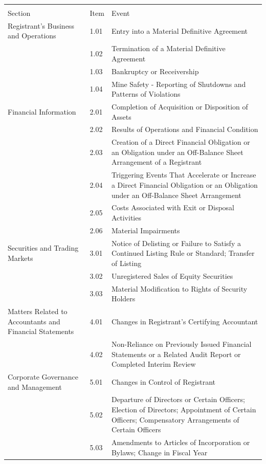 \documentclass{article}
\begin{document}
\begin{table}[h!]
	\begin{tabularx}{\textwidth}{|X|l|X|}
		\toprule
		&      &                                   \\
		Section & Item & Event \\
		\midrule
		Registrant's Business and Operations & 1.01 & Entry into a Material Definitive Agreement \\
		& 1.02 & Termination of a Material Definitive Agreement \\
		& 1.03 & Bankruptcy or Receivership \\
		& 1.04 & Mine Safety - Reporting of Shutdowns and Patterns of Violations \\
		Financial Information & 2.01 & Completion of Acquisition or Disposition of Assets \\
		& 2.02 & Results of Operations and Financial Condition \\
		& 2.03 & Creation of a Direct Financial Obligation or an Obligation under an Off-Balance Sheet Arrangement of a Registrant \\
		& 2.04 & Triggering Events That Accelerate or Increase a Direct Financial Obligation or an Obligation under an Off-Balance Sheet Arrangement \\
		& 2.05 & Costs Associated with Exit or Disposal Activities \\
		& 2.06 & Material Impairments \\
		Securities and Trading Markets & 3.01 & Notice of Delisting or Failure to Satisfy a Continued Listing Rule or Standard; Transfer of Listing \\
		& 3.02 & Unregistered Sales of Equity Securities \\
		& 3.03 & Material Modification to Rights of Security Holders \\
		Matters Related to Accountants and Financial Statements & 4.01 & Changes in Registrant's Certifying Accountant \\
		& 4.02 & Non-Reliance on Previously Issued Financial Statements or a Related Audit Report or Completed Interim Review \\
		Corporate Governance and Management & 5.01 & Changes in Control of Registrant \\
		& 5.02 & Departure of Directors or Certain Officers; Election of Directors; Appointment of Certain Officers; Compensatory Arrangements of Certain Officers \\
		& 5.03 & Amendments to Articles of Incorporation or Bylaws; Change in Fiscal Year \\

\end{tabularx}
\end{table}
\end{document}
